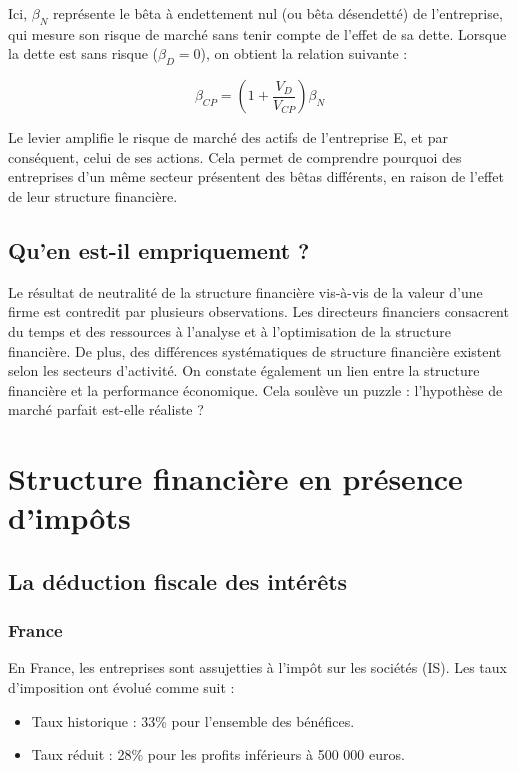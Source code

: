 \documentclass[a4paper, 12pt]{report}
\begin{document}
Ici, \( \beta_N \) représente le bêta à endettement nul (ou bêta désendetté) de l'entreprise, qui mesure son risque de marché sans tenir compte de l'effet de sa dette. Lorsque la dette est sans risque (\( \beta_D = 0 \)), on obtient la relation suivante :

\[
\beta_{CP} = \left(1 + \frac{V_D}{V_{CP}}\right) \beta_N
\]

Le levier amplifie le risque de marché des actifs de l'entreprise E, et par conséquent, celui de ses actions. Cela permet de comprendre pourquoi des entreprises d'un même secteur présentent des bêtas différents, en raison de l'effet de leur structure financière.

\section{Qu'en est-il empriquement ?}

Le résultat de neutralité de la structure financière vis-à-vis de la valeur d’une firme est contredit par plusieurs observations. Les directeurs financiers consacrent du temps et des ressources à l'analyse et à l'optimisation de la structure financière. De plus, des différences systématiques de structure financière existent selon les secteurs d'activité. On constate également un lien entre la structure financière et la performance économique. Cela soulève un puzzle : l'hypothèse de marché parfait est-elle réaliste ?

\chapter{Structure financière en présence d'impôts}

\section{La déduction fiscale des intérêts}

\subsection{France}

En France, les entreprises sont assujetties à l'impôt sur les sociétés (IS). Les taux d'imposition ont évolué comme suit :
\begin{itemize}
	\item Taux historique : 33\% pour l'ensemble des bénéfices.
	\item Taux réduit : 28\% pour les profits inférieurs à 500 000 euros.
\end{itemize}
\end{document}
